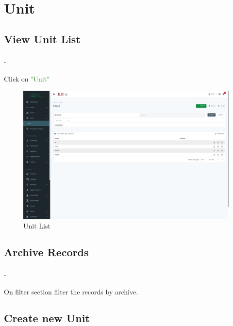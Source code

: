 \section{Unit}\label{sec:unit}

\subsection{View Unit List}\label{sec:unit_list}
\setcounter{stepcounter}{1}
\paragraph{.}Click on \textcolor{ForestGreen}{"Unit"}
\begin{figure}[h!]
  	\includegraphics[width=15cm]{screenshots/unit_list_page.png}
  	\caption{Unit List}
  	\label{fig:unit_list_page}
\end{figure}

\subsection{Archive Records}\label{sec:unit_list_archived}
\setcounter{stepcounter}{1}
\paragraph{.}On filter section filter the records by archive.

\subsection{Create new Unit}\label{sec:unit_create}
\setcounter{stepcounter}{1}
